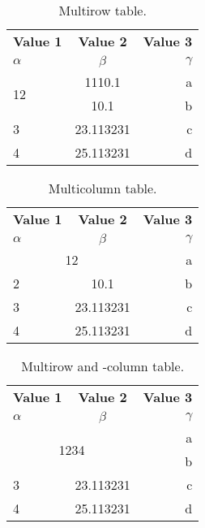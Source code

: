 \documentclass{article}
\begin{document}
	\begin{table}[h!]
		\begin{center}
			\caption{Multirow table.}
			\label{tab:table1}
			\begin{tabular}{l|c|r}
				\textbf{Value 1} & \textbf{Value 2} & \textbf{Value 3}\\
				$\alpha$ & $\beta$ & $\gamma$ \\
				\hline
				\multirow{2}{*}{12} & 1110.1 & a\\ %
				& 10.1 & b\\ %
				\hline
				3 & 23.113231 & c\\
				4 & 25.113231 & d\\
			\end{tabular}
		\end{center}
	\end{table}
	
	\begin{table}[h!]
		\begin{center}
			\caption{Multicolumn table.}
			\label{tab:table1}
			\begin{tabular}{l|c|r}
				\textbf{Value 1} & \textbf{Value 2} & \textbf{Value 3}\\
				$\alpha$ & $\beta$ & $\gamma$ \\
				\hline
				\multicolumn{2}{c|}{12} & a\\ %
				\hline
				2 & 10.1 & b\\
				3 & 23.113231 & c\\
				4 & 25.113231 & d\\
			\end{tabular}
		\end{center}
	\end{table}

\begin{table}[h!]
	\begin{center}
		\caption{Multirow and -column table.}
		\label{tab:table1}
		\begin{tabular}{l|c|r}
			\textbf{Value 1} & \textbf{Value 2} & \textbf{Value 3}\\
			$\alpha$ & $\beta$ & $\gamma$ \\
			\hline
			\multicolumn{2}{c|}{\multirow{2}{*}{1234}} & a\\ %
			\multicolumn{2}{c|}{} & b\\ %
			\hline
			3 & 23.113231 & c\\
			4 & 25.113231 & d\\
		\end{tabular}
	\end{center}
\end{table}
\end{document}
